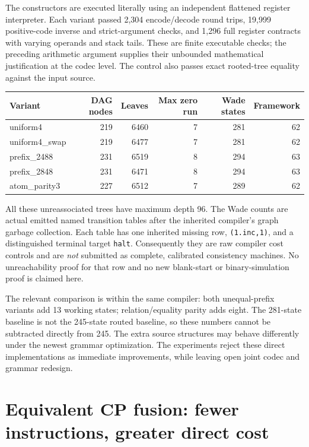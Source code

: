 \documentclass[11pt]{article}
\begin{document}
The constructors are executed literally using an independent flattened
register interpreter.  Each variant passed 2,304 encode/decode round trips,
19,999 positive-code inverse and strict-argument checks, and 1,296 full register
contracts with varying operands and stack tails.  These are finite executable
checks; the preceding arithmetic argument supplies their unbounded mathematical
justification at the codec level.  The control also passes exact rooted-tree
equality against the input source.

\begin{center}
\begin{tabular}{@{}lrrrrr@{}}
\toprule
Variant&DAG nodes&Leaves&Max zero run&Wade states&Framework\\
\midrule
uniform4&219&6460&7&281&62\\
uniform4\_swap&219&6477&7&281&62\\
prefix\_2488&231&6519&8&294&63\\
prefix\_2848&231&6471&8&294&63\\
atom\_parity3&227&6512&7&289&62\\
\bottomrule
\end{tabular}
\end{center}
All these unreassociated trees have maximum depth 96.  The Wade counts are
actual emitted named transition tables after the inherited compiler's graph
garbage collection.  Each table has one inherited missing row,
\texttt{(1.inc,1)}, and a distinguished terminal target \texttt{halt}.
Consequently they are raw compiler cost controls and are \emph{not} submitted
as complete, calibrated consistency machines.  No unreachability proof for
that row and no new blank-start or binary-simulation proof is claimed here.

The relevant comparison is within the same compiler: both unequal-prefix
variants add 13 working states; relation/equality parity adds eight.  The
281-state baseline is not the 245-state routed baseline, so these numbers
cannot be subtracted directly from 245.  The extra source structures may
behave differently under the newest grammar optimization.  The experiments
reject these direct implementations as immediate improvements, while leaving
open joint codec and grammar redesign.

\section{Equivalent CP fusion: fewer instructions, greater direct cost}
\end{document}
